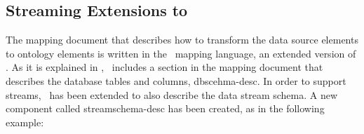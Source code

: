 



\subsection{Streaming Extensions to \rtwoo}
\label{streamingr2osyntax}

The mapping document that describes how to transform the data source elements to ontology elements is written in the
\stwoo\ mapping language, an extended version of \rtwoo. As it is explained in \cite{Barrasa_04}, \rtwoo\ includes a
section in the mapping document that describes the database tables and columns, \textsf{dbscehma-desc}. In order to
support streams, \rtwoo\ has been extended to also describe the data stream schema. A new component called
\textsf{streamschema-desc} has been created, as in the following example:

